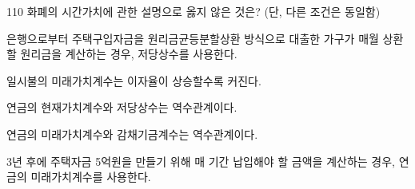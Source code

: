 \begin{question}{110}
화폐의 시간가치에 관한 설명으로 옳지 않은 것은? (단, 다른 조건은 동일함)
\begin{choices}
  \item 은행으로부터 주택구입자금을 원리금균등분할상환 방식으로 대출한 가구가 매월 상환할 원리금을 계산하는 경우, 저당상수를 사용한다.
  \item 일시불의 미래가치계수는 이자율이 상승할수록 커진다.
  \item 연금의 현재가치계수와 저당상수는 역수관계이다.
  \item 연금의 미래가치계수와 감채기금계수는 역수관계이다.
  \item 3년 후에 주택자금 5억원을 만들기 위해 매 기간 납입해야 할 금액을 계산하는 경우, 연금의 미래가치계수를 사용한다.
\end{choices}
\end{question}
